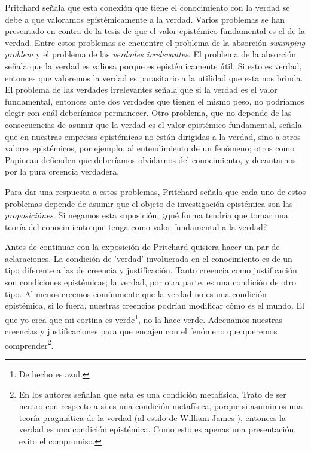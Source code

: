 \documentclass[12pt]{article}
\begin{document}
Pritchard señala que esta conexión que tiene el conocimiento con la verdad se debe a que valoramos epistémicamente a la verdad. Varios problemas se han presentado en contra de la tesis de que el valor epistémico fundamental es el de la verdad. Entre estos problemas se encuentre el problema de la absorción \textit{swamping problem} y el problema de las \textit{verdades irrelevantes}. El problema de la absorción señala que la verdad es valiosa porque es epistémicamente útil. Si esto es verdad, entonces que valoremos la verdad es parasitario a la utilidad que esta nos brinda. El problema de las verdades irrelevantes señala que si la verdad es el valor fundamental, entonces ante dos verdades que tienen el mismo peso, no podríamos elegir con cuál deberíamos permanecer. Otro problema, que no depende de las consecuencias de asumir que la verdad es el valor epistémico fundamental, señala que en nuestras empresas epistémicas no están dirigidas a la verdad, sino a otros valores epistémicos, por ejemplo, al entendimiento de un fenómeno; otros como Papineau \cite{Papineau2021} defienden que deberíamos olvidarnos del conocimiento, y decantarnos por la pura creencia verdadera.

Para dar una respuesta a estos problemas, Pritchard señala que cada uno de estos problemas depende de asumir que el objeto de investigación epistémica son las \textit{proposiciónes}. Si negamos esta suposición, ¿qué forma tendría que tomar una teoría del conocimiento que tenga como valor fundamental a la verdad?

Antes de continuar con la exposición de Pritchard quisiera hacer un par de aclaraciones. La condición de 'verdad' involucrada en el conocimiento es de un tipo diferente a las de creencia y justificación. Tanto creencia como justificación son condiciones epistémicas; la verdad, por otra parte, es una condición de otro tipo. Al menos creemos comúnmente que la verdad no es una condición epistémica, si lo fuera, nuestras creencias podrían modificar cómo es el mundo. El que yo crea que mi cortina es verde\footnote{De hecho es azul.}, no la hace verde. Adecuamos nuestras creencias y justificaciones para que encajen con el fenómeno que queremos comprender\footnote{En \cite{sep-knowledge-analysis} los autores señalan que esta es una condición metafísica. Trato de ser neutro con respecto a si es una condición metafísica, porque si asumimos una teoría pragmática de la verdad (al estilo de William James ), entonces la verdad es una condición epistémica. Como esto es apenas una presentación, evito el compromiso.}.  
\end{document}
